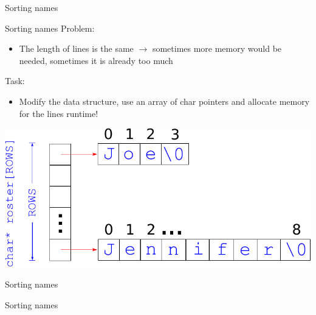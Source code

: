 \documentclass[usenames,dvipsnames,aspectratio=169]{beamer}
\begin{document}
\begin{frame}{Sorting names}
  \begin{exampleblock}{}
    
  \end{exampleblock}
\end{frame}

\begin{frame}{Sorting names}
  Problem:
  \begin{itemize}
    \item[] The length of lines is the same $\to$ sometimes more memory would be needed, sometimes it is already too much
  \end{itemize}
  Task:
  \begin{itemize}
    \item[] Modify the data structure, use an array of char pointers and allocate memory for the lines runtime!
  \end{itemize}
  \begin{center}
    \includegraphics[scale=0.6]{roster2.pdf}
  \end{center}
\end{frame}

\begin{frame}{Sorting names}
  \begin{exampleblock}{}
    
    
  \end{exampleblock}
\end{frame}

\begin{frame}{Sorting names}
  \footnotesize
  \begin{exampleblock}{}
    
  \end{exampleblock}
\end{frame}
\end{document}
